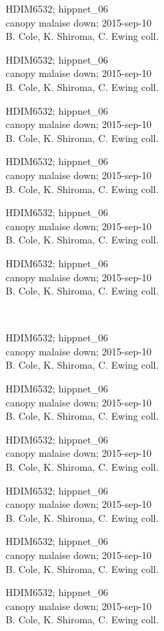 \documentclass[2pt]{extarticle}
\begin{document}
\noindent
\parbox{0.16\textwidth}{\tiny \raggedright \rule[-0.3\baselineskip]{0pt}{10pt}HDIM6532; hippnet\_06\\ canopy malaise down; 2015-sep-10\\ B. Cole, K. Shiroma, C. Ewing coll.}
\parbox{0.16\textwidth}{\tiny \raggedright \rule[-0.3\baselineskip]{0pt}{10pt}HDIM6532; hippnet\_06\\ canopy malaise down; 2015-sep-10\\ B. Cole, K. Shiroma, C. Ewing coll.}
\parbox{0.16\textwidth}{\tiny \raggedright \rule[-0.3\baselineskip]{0pt}{10pt}HDIM6532; hippnet\_06\\ canopy malaise down; 2015-sep-10\\ B. Cole, K. Shiroma, C. Ewing coll.}
\parbox{0.16\textwidth}{\tiny \raggedright \rule[-0.3\baselineskip]{0pt}{10pt}HDIM6532; hippnet\_06\\ canopy malaise down; 2015-sep-10\\ B. Cole, K. Shiroma, C. Ewing coll.}
\parbox{0.16\textwidth}{\tiny \raggedright \rule[-0.3\baselineskip]{0pt}{10pt}HDIM6532; hippnet\_06\\ canopy malaise down; 2015-sep-10\\ B. Cole, K. Shiroma, C. Ewing coll.}
\parbox{0.16\textwidth}{\tiny \raggedright \rule[-0.3\baselineskip]{0pt}{10pt}HDIM6532; hippnet\_06\\ canopy malaise down; 2015-sep-10\\ B. Cole, K. Shiroma, C. Ewing coll.} \\ 
\vspace{0.001in} 

\noindent
\parbox{0.16\textwidth}{\tiny \raggedright \rule[-0.3\baselineskip]{0pt}{10pt}HDIM6532; hippnet\_06\\ canopy malaise down; 2015-sep-10\\ B. Cole, K. Shiroma, C. Ewing coll.}
\parbox{0.16\textwidth}{\tiny \raggedright \rule[-0.3\baselineskip]{0pt}{10pt}HDIM6532; hippnet\_06\\ canopy malaise down; 2015-sep-10\\ B. Cole, K. Shiroma, C. Ewing coll.}
\parbox{0.16\textwidth}{\tiny \raggedright \rule[-0.3\baselineskip]{0pt}{10pt}HDIM6532; hippnet\_06\\ canopy malaise down; 2015-sep-10\\ B. Cole, K. Shiroma, C. Ewing coll.}
\parbox{0.16\textwidth}{\tiny \raggedright \rule[-0.3\baselineskip]{0pt}{10pt}HDIM6532; hippnet\_06\\ canopy malaise down; 2015-sep-10\\ B. Cole, K. Shiroma, C. Ewing coll.}
\parbox{0.16\textwidth}{\tiny \raggedright \rule[-0.3\baselineskip]{0pt}{10pt}HDIM6532; hippnet\_06\\ canopy malaise down; 2015-sep-10\\ B. Cole, K. Shiroma, C. Ewing coll.}
\parbox{0.16\textwidth}{\tiny \raggedright \rule[-0.3\baselineskip]{0pt}{10pt}HDIM6532; hippnet\_06\\ canopy malaise down; 2015-sep-10\\ B. Cole, K. Shiroma, C. Ewing coll.} \\ 
\vspace{0.001in} 
\end{document}
